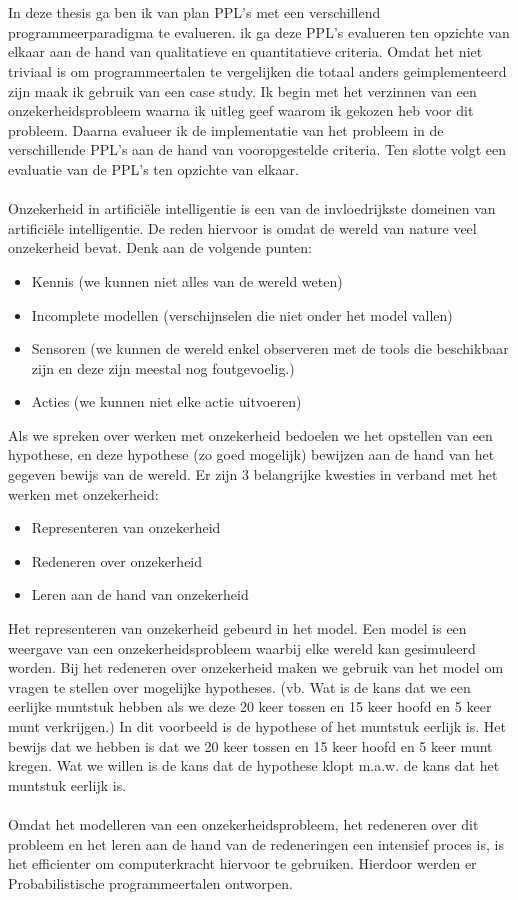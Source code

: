\documentclass[12pt,a4paper,oneside]{book}
\begin{document}
\\\\
In deze thesis ga ben ik van plan PPL’s met een verschillend programmeerparadigma te evalueren. ik ga deze PPL’s evalueren ten opzichte van elkaar aan de hand van qualitatieve en quantitatieve criteria. Omdat het niet triviaal is om programmeertalen te vergelijken die totaal anders geimplementeerd zijn maak ik gebruik van een case study. Ik begin met het verzinnen van een onzekerheidsprobleem waarna ik uitleg geef waarom ik gekozen heb voor dit probleem. Daarna evalueer ik de implementatie van het probleem in de verschillende PPL’s aan de hand van vooropgestelde criteria. Ten slotte volgt een evaluatie van de PPL’s ten opzichte van elkaar. 
\\\\

Onzekerheid in artifici\"{e}le intelligentie is een van de invloedrijkste domeinen van artifici\"{e}le intelligentie. De reden hiervoor is omdat de wereld van nature veel onzekerheid bevat. Denk aan de volgende punten:
\begin{itemize}
	\item Kennis (we kunnen niet alles van de wereld weten)
	\item Incomplete modellen (verschijnselen die niet onder het model vallen)
	\item Sensoren (we kunnen de wereld enkel observeren met de tools die beschikbaar zijn en deze zijn meestal nog foutgevoelig.)
	\item Acties (we kunnen niet elke actie uitvoeren)
\end{itemize}
Als we spreken over werken met onzekerheid bedoelen we het opstellen van een hypothese, en deze hypothese (zo goed mogelijk) bewijzen aan de hand van het gegeven bewijs van de wereld.
Er zijn 3 belangrijke kwesties in verband met het werken met onzekerheid:
\begin{itemize}
	\item Representeren van onzekerheid
	\item Redeneren over onzekerheid
	\item Leren aan de hand van onzekerheid
\end{itemize}
Het representeren van onzekerheid gebeurd in het model. Een model is een weergave van een onzekerheidsprobleem waarbij elke wereld kan gesimuleerd worden.
Bij het redeneren over onzekerheid maken we gebruik van het model om vragen te stellen over mogelijke hypotheses. 
(vb. Wat is de kans dat we een eerlijke muntstuk hebben als we deze 20 keer tossen en 15 keer hoofd en 5 keer munt verkrijgen.)
In dit voorbeeld is de hypothese of het muntstuk eerlijk is. Het bewijs dat we hebben is dat we 20 keer tossen en 15 keer hoofd en 5 keer munt kregen. Wat we willen is de kans dat de hypothese klopt m.a.w. de kans dat het muntstuk eerlijk is.
\\\\
Omdat het modelleren van een onzekerheidsprobleem, het redeneren over dit probleem en het leren aan de hand van de redeneringen een intensief proces is, is het efficienter om computerkracht hiervoor te gebruiken. Hierdoor werden er Probabilistische programmeertalen ontworpen.
\end{document}
